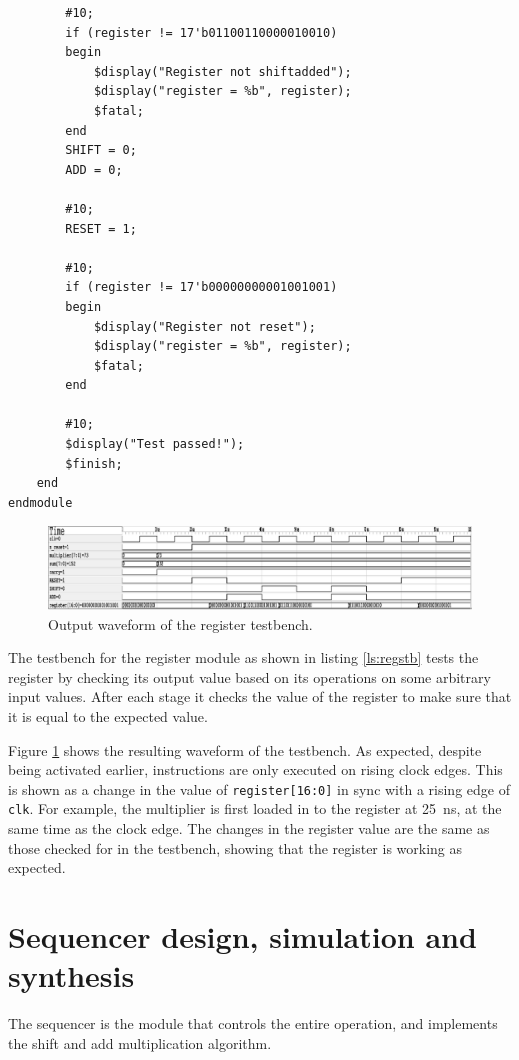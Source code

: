 \documentclass[a4paper,11pt]{article}
\begin{document}
\begin{lstlisting}
        #10;
        if (register != 17'b01100110000010010)
        begin
            $display("Register not shiftadded");
            $display("register = %b", register);
            $fatal;
        end
        SHIFT = 0;
        ADD = 0;
        
        #10;
        RESET = 1;
        
        #10;
        if (register != 17'b00000000001001001)
        begin
            $display("Register not reset");
            $display("register = %b", register);
            $fatal;
        end
        
        #10;
        $display("Test passed!");
        $finish;
    end
endmodule
\end{lstlisting}

\begin{figure}[H]
    \centering
        \includegraphics[scale=0.65]{../out/regs_tb.eps}
    \caption{Output waveform of the register testbench.}
    \label{fig:regstbw}
\end{figure}

The testbench for the register module as shown in listing \ref{ls:regstb} tests the register by checking its output value based on its operations on some arbitrary input values. After each stage it checks the value of the register to make sure that it is equal to the expected value.

Figure \ref{fig:regstbw} shows the resulting waveform of the testbench. As expected, despite being activated earlier, instructions are only executed on rising clock edges. This is shown as a change in the value of \lstinline{register[16:0]} in sync with a rising edge of \lstinline{clk}. For example, the multiplier is first loaded in to the register at \SI{25}{\nano\second}, at the same time as the clock edge. The changes in the register value are the same as those checked for in the testbench, showing that the register is working as expected.

\section{Sequencer design, simulation and synthesis}

The sequencer is the module that controls the entire operation, and implements the shift and add multiplication algorithm.
\end{document}
